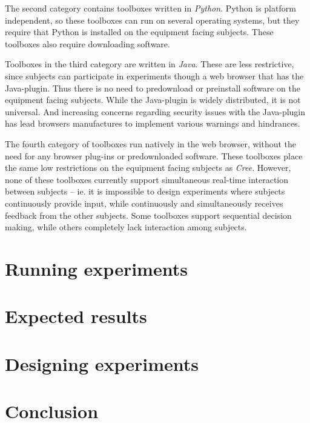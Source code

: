 \documentclass[preprint, 12pt]{elsarticle}
\newcommand{\Cree}{\emph{Cree}\xspace}
\begin{document}
The second category contains toolboxes written in \emph{Python}. Python is platform independent, so these toolboxes can run on several operating systems, but they require that Python is installed on the equipment facing subjects\footnotemark[3]. These toolboxes also require downloading software.


Toolboxes in the third category are written in \emph{Java}. These are less restrictive, since subjects can participate in experiments though a web browser that has the Java-plugin. Thus there is no need to predownload or preinstall software on the equipment facing subjects. While the Java-plugin is widely distributed, it is not universal\footnotemark[4]. And increasing concerns regarding security issues with the Java-plugin has lead browsers manufactures to implement various warnings and hindrances\footnotemark[5]. 

 

The fourth category of toolboxes run natively in the web browser, without the need for any browser plug-ins or predownloaded software. These toolboxes place the same low restrictions on the equipment facing subjects as \Cree. However, none of these toolboxes currently support simultaneous real-time interaction between subjects -- ie. it is impossible to design experiments where subjects continuously provide input, while continuously and simultaneously receives feedback from the other subjects. Some toolboxes support sequential decision making, while others completely lack interaction among subjects.

\section{Running experiments}
\label{S:Running}

\section{Expected results}
\label{S:Results}

\section{Designing experiments}
\label{S:Designing}

\section{Conclusion}
\label{S:Conclusion}



\raggedright
\singlespacing

\end{document}
